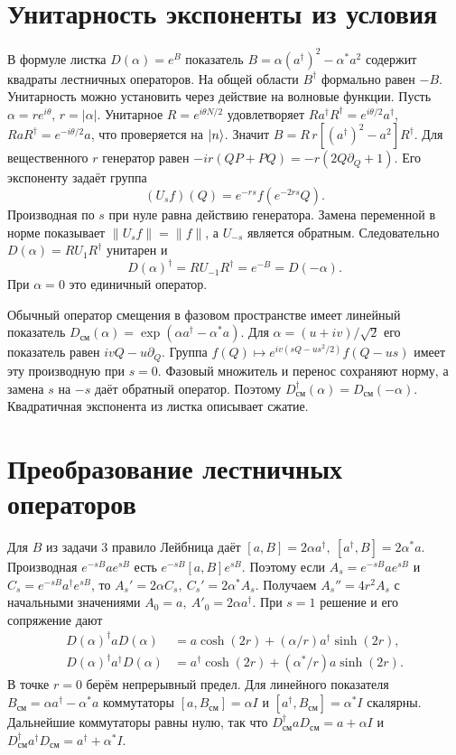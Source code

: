 \documentclass[11pt,a4paper]{article}
\begin{document}
\section{Унитарность экспоненты из условия}

В формуле листка \(D(\alpha)=e^B\) показатель
\(B=\alpha(a^\dagger)^2-\alpha^*a^2\) содержит квадраты
лестничных операторов.
На общей области \(B^\dagger\) формально равен \(-B\).
Унитарность можно установить через действие на волновые функции.
Пусть \(\alpha=r e^{i\theta}\), \(r=|\alpha|\).
Унитарное \(R=e^{i\theta N/2}\) удовлетворяет
\(R a^\dagger R^\dagger=e^{i\theta/2}a^\dagger\),
\(R a R^\dagger=e^{-i\theta/2}a\), что проверяется на \(\lvert n\rangle\).
Значит \(B=R\, r[(a^\dagger)^2-a^2]R^\dagger\).
Для вещественного \(r\) генератор равен
\(-ir(QP+PQ)=-r(2Q\partial_Q+1)\).
Его экспоненту задаёт группа
\[
 (U_s f)(Q)=e^{-rs} f(e^{-2rs}Q).
\]
Производная по \(s\) при нуле равна действию генератора.
Замена переменной в норме показывает \(\|U_s f\|=\|f\|\),
а \(U_{-s}\) является обратным. Следовательно
\(D(\alpha)=R U_1 R^\dagger\) унитарен и
\[
 D(\alpha)^\dagger=R U_{-1}R^\dagger=e^{-B}=D(-\alpha).
\]
При \(\alpha=0\) это единичный оператор.

Обычный оператор смещения в фазовом пространстве имеет линейный
показатель \(D_{\text{см}}(\alpha)=\exp(\alpha a^\dagger-\alpha^*a)\).
Для \(\alpha=(u+iv)/\sqrt2\) его показатель равен
\(ivQ-u\partial_Q\). Группа
\(f(Q)\mapsto e^{iv(sQ-us^2/2)}f(Q-us)\) имеет эту производную
при \(s=0\). Фазовый множитель и перенос сохраняют норму,
а замена \(s\) на \(-s\) даёт обратный оператор.
Поэтому \(D_{\text{см}}^\dagger(\alpha)=D_{\text{см}}(-\alpha)\).
Квадратичная экспонента из листка описывает сжатие.

\section{Преобразование лестничных операторов}

Для \(B\) из задачи 3 правило Лейбница даёт
\([a,B]=2\alpha a^\dagger,\ [a^\dagger,B]=2\alpha^*a\).
Производная \(e^{-sB}a e^{sB}\) есть \(e^{-sB}[a,B]e^{sB}\).
Поэтому если \(A_s=e^{-sB}a e^{sB}\) и
\(C_s=e^{-sB}a^\dagger e^{sB}\), то
\(A_s'=2\alpha C_s,\ C_s'=2\alpha^*A_s\).
Получаем \(A_s''=4r^2 A_s\) с начальными значениями
\(A_0=a,\ A'_0=2\alpha a^\dagger\).
При \(s=1\) решение и его сопряжение дают
\begin{align*}
 D(\alpha)^\dagger a D(\alpha)
    &=a\cosh(2r)+(\alpha/r)a^\dagger\sinh(2r),\\
 D(\alpha)^\dagger a^\dagger D(\alpha)
    &=a^\dagger\cosh(2r)+(\alpha^*/r)a\sinh(2r).
\end{align*}
В точке \(r=0\) берём непрерывный предел.
Для линейного показателя \(B_{\text{см}}=\alpha a^\dagger-\alpha^*a\)
коммутаторы \([a,B_{\text{см}}]=\alpha I\) и
\([a^\dagger,B_{\text{см}}]=\alpha^* I\) скалярны.
Дальнейшие коммутаторы равны нулю, так что
\(D_{\text{см}}^\dagger a D_{\text{см}}=a+\alpha I\) и
\(D_{\text{см}}^\dagger a^\dagger D_{\text{см}}=a^\dagger+\alpha^*I\).
\end{document}
